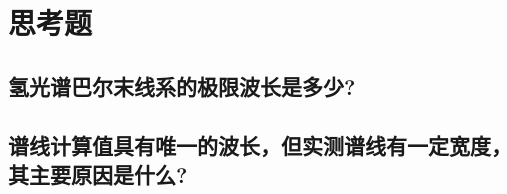 \documentclass[a4paper]{article}
\begin{document}
\section{思考题}
\subsection{氢光谱巴尔末线系的极限波长是多少?}
\subsection{谱线计算值具有唯一的波长，但实测谱线有一定宽度，其主要原因是什么? }

\nocite{jiaocai}

\end{document}

